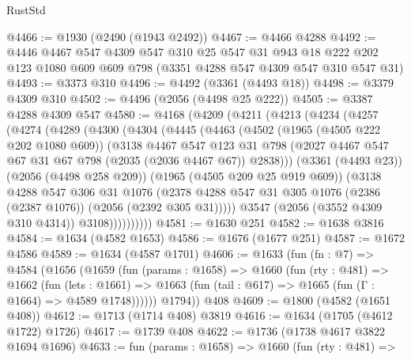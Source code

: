 \begin{lexlean}{RustStd}
\begin{coremodule}
@4466 := @1930 (@2490 (@1943 @2492))
@4467 := @4466 @4288
@4492 := @4446
    @4467
    @547
    @4309
    @547
    @310
    @25
    @547
    @31
    @943
    @18
    @222
    @202
    @123
    @1080
    @609
    @609
    @798
    (@3351 @4288 @547 @4309 @547 @310 @547 @31)
@4493 := @3373 @310
@4496 := @4492 (@3361 (@4493 @18))
@4498 := @3379 @4309 @310
@4502 := @4496 (@2056 (@4498 @25 @222))
@4505 := @3387 @4288 @4309 @547
@4580 := @4168
    (@4209
      (@4211
        (@4213
          (@4234
            (@4257
              (@4274
                (@4289
                  (@4300
                    (@4304
                      (@4445
                        (@4463
                          (@4502
                            (@1965 (@4505 @222 @202 @1080 @609))
                            (@3138
                              @4467
                              @547
                              @123
                              @31
                              @798
                              (@2027 @4467 @547 @67 @31 @67 @798 (@2035 (@2036 @4467 @67)) @2838)))
                          (@3361 (@4493 @23))
                          (@2056 (@4498 @258 @209))
                          (@1965 (@4505 @209 @25 @919 @609))
                          (@3138
                            @4288
                            @547
                            @306
                            @31
                            @1076
                            (@2378
                              @4288
                              @547
                              @31
                              @305
                              @1076
                              (@2386 (@2387 @1076))
                              (@2056 (@2392 @305 @31)))))
                        @3547
                        (@2056 (@3552 @4309 @310 @4314))
                        @3108))))))))))
@4581 := @1630 @251
@4582 := @1638 @3816
@4584 := @1634 (@4582 @1653)
@4586 := @1676 (@1677 @251)
@4587 := @1672 @4586
@4589 := @1634 (@4587 @1701)
@4606 := @1633
    (fun (fn : @7) =>
    @4584
      (@1656
        (@1659
          (fun (params : @1658) =>
          @1660
            (fun (rty : @481) =>
            @1662
              (fun (lets : @1661) =>
              @1663 (fun (tail : @617) => @1665 (fun (Γ : @1664) => @4589 @1748))))))
        @1794))
    @408
@4609 := @1800 (@4582 (@1651 @408))
@4612 := @1713 (@1714 @408) @3819
@4616 := @1634 (@1705 (@4612 @1722) @1726)
@4617 := @1739 @408
@4622 := @1736 (@1738 @4617 @3822 @1694 @1696)
@4633 := fun (params : @1658) =>
  @1660
    (fun (rty : @481) =>

\end{coremodule}
\end{lexlean}
